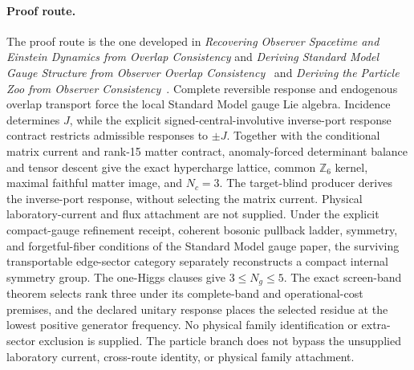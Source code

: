 \paragraph{Proof route.}
The proof route is the one developed in
\emph{Recovering Observer Spacetime and Einstein Dynamics from Overlap Consistency} and
\emph{Deriving Standard Model Gauge Structure from Observer Overlap Consistency}~\cite{ophEinstein,ophGauge}
and
\emph{Deriving the Particle Zoo from Observer Consistency}~\cite{ophparticles}.
Complete reversible response and endogenous overlap transport force the local
Standard Model gauge Lie algebra. Incidence determines \(J\), while the explicit
signed-central-involutive inverse-port response contract restricts admissible
responses to \(\pm J\). Together with the conditional matrix current and
rank-15 matter contract, anomaly-forced determinant balance and tensor
descent give the exact hypercharge lattice, common \(\mathbb Z_6\) kernel,
maximal faithful matter image, and \(N_c=3\).
The target-blind producer derives the inverse-port response, without
selecting the matrix current. Physical
laboratory-current and flux attachment are not supplied. Under
the explicit compact-gauge refinement receipt, coherent bosonic
pullback ladder, symmetry, and forgetful-fiber conditions of the Standard
Model gauge paper, the surviving transportable edge-sector category separately
reconstructs a compact internal symmetry group. The one-Higgs clauses give
\(3\le N_g\le5\). The exact screen-band theorem selects rank three under its
complete-band and operational-cost premises, and the declared unitary response
places the selected residue at the lowest positive generator frequency.
No physical family identification or extra-sector exclusion is supplied. The
particle branch does not bypass the unsupplied laboratory current, cross-route
identity, or physical family attachment.

